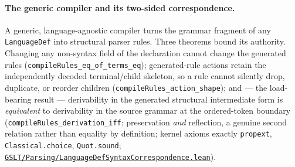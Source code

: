 \documentclass[11pt]{article}
\newcommand{\code}[1]{\texttt{#1}}
\begin{document}
\begin{center}
\end{center}

\paragraph{The generic compiler and its two-sided correspondence.}  A
generic, language-agnostic compiler turns the grammar fragment of any
\code{LanguageDef} into structural parser rules.  Three theorems bound its
authority.  Changing any non-syntax field of the declaration cannot change
the generated rules (\code{compileRules\_eq\_of\_terms\_eq}); generated-rule
actions retain the independently decoded terminal/child skeleton, so a rule
cannot silently drop, duplicate, or reorder children
(\code{compileRules\_action\_shape}); and --- the load-bearing result ---
derivability in the generated structural intermediate form is
\emph{equivalent} to derivability in the source grammar at the
ordered-token boundary (\code{compileRules\_derivation\_iff}: preservation
\emph{and} reflection, a genuine second relation rather than equality by
definition; kernel axioms exactly \code{propext},
\code{Classical.choice}, \code{Quot.sound};
\href{https://github.com/zariuq/MeTTapedia/blob/main/lean/mettapedia/Mettapedia/GSLT/Parsing/LanguageDefSyntaxCorrespondence.lean}{\code{GSLT/Parsing/LanguageDefSyntaxCorrespondence.lean}}).
\end{document}
